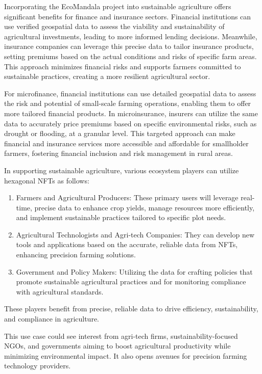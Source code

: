 \documentclass{scrreport}
\begin{document}
Incorporating the EcoMandala project into sustainable agriculture offers significant benefits for finance and insurance sectors. Financial institutions can use verified geospatial data to assess the viability and sustainability of agricultural investments, leading to more informed lending decisions. Meanwhile, insurance companies can leverage this precise data to tailor insurance products, setting premiums based on the actual conditions and risks of specific farm areas. This approach minimizes financial risks and supports farmers committed to sustainable practices, creating a more resilient agricultural sector.

For microfinance, financial institutions can use detailed geospatial data to assess the risk and potential of small-scale farming operations, enabling them to offer more tailored financial products. In microinsurance, insurers can utilize the same data to accurately price premiums based on specific environmental risks, such as drought or flooding, at a granular level. This targeted approach can make financial and insurance services more accessible and affordable for smallholder farmers, fostering financial inclusion and risk management in rural areas.

In supporting sustainable agriculture, various ecosystem players can utilize hexagonal NFTs as follows:
\begin{enumerate}
    \item Farmers and Agricultural Producers: These primary users will leverage real-time, precise data to enhance crop yields, manage resources more efficiently, and implement sustainable practices tailored to specific plot needs.
    \item Agricultural Technologists and Agri-tech Companies: They can develop new tools and applications based on the accurate, reliable data from NFTs, enhancing precision farming solutions.
    \item Government and Policy Makers: Utilizing the data for crafting policies that promote sustainable agricultural practices and for monitoring compliance with agricultural standards.
\end{enumerate}
These players benefit from precise, reliable data to drive efficiency, sustainability, and compliance in agriculture.

This use case could see interest from agri-tech firms, sustainability-focused NGOs, and governments aiming to boost agricultural productivity while minimizing environmental impact. It also opens avenues for precision farming technology providers.
\end{document}
